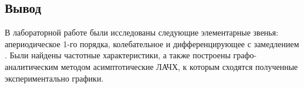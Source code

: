 \documentclass[a4paper, 12pt]{article}
\begin{document}
\newpage
\begin{center}
	\section*{Вывод}
\end{center}
\par 
В лабораторной работе были исследованы следующие элементарные звенья: апериодическое 1-го порядка, колебательное и дифференцирующее с замедлением . Были найдены частотные характеристики, а также построены графо-аналитическим методом асимптотические ЛАЧХ, к которым сходятся полученные экспериментально графики.
\end{document}
